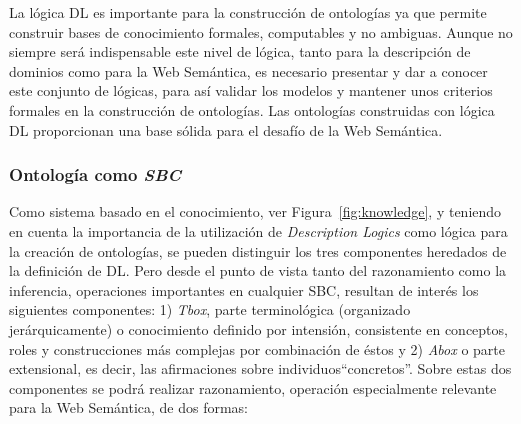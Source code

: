 La lógica DL es importante para la construcción de ontologías ya que permite
construir bases de conocimiento formales, computables y no ambiguas. Aunque no siempre será indispensable este nivel 
de lógica, tanto para la descripción de dominios como para la Web Semántica, es necesario presentar y dar a conocer este conjunto
de lógicas, para así validar los modelos y mantener unos criterios
formales en la construcción de ontologías. Las ontologías construidas con lógica
DL proporcionan una base sólida para el desafío de la Web Semántica.


\subsubsection{Ontología como \textit{SBC}}
Como sistema basado en el conocimiento, ver Figura~\ref{fig:knowledge}, y teniendo en
cuenta la importancia de la utilización de \textit{Description Logics} como lógica para
la creación de ontologías, se pueden distinguir los tres componentes heredados de
la definición de \gls{DL}. Pero desde el punto de vista tanto del razonamiento como la
inferencia, operaciones importantes en cualquier \gls{SBC}, resultan de interés los
siguientes componentes: 1) \textit{Tbox}, parte terminológica (organizado jerárquicamente) o
conocimiento definido por intensión, consistente en conceptos, roles y construcciones más complejas por combinación de éstos y 
2) \textit{Abox} o parte extensional, es decir,  las afirmaciones sobre individuos``concretos''. Sobre estas dos componentes se podrá realizar
razonamiento, operación especialmente relevante para la Web Semántica, de dos formas:

